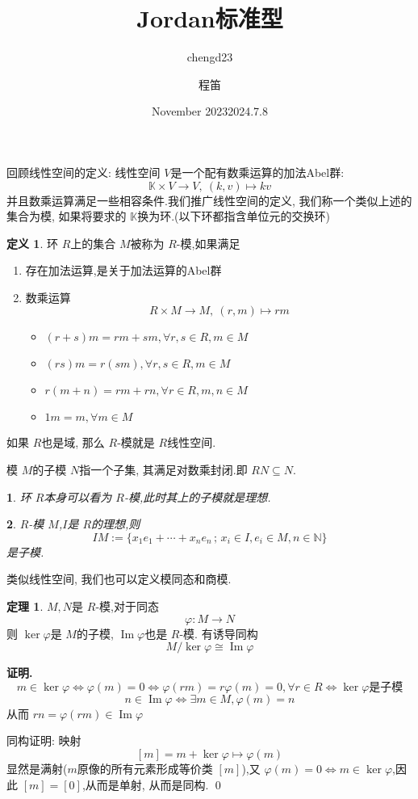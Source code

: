 \documentclass[12pt, a4paper,oneside, UTF8]{ctexart}
\author{chengd23 }
\date{November 2023}
\title{\textbf{Jordan标准型}}
\author{程笛}
\date{2024.7.8}
\theoremstyle{definition}
\newtheorem{defn}{\indent 定义}
\newtheorem{thm}[lemma]{\indent 定理}
\theoremstyle{plain}
\newtheorem{example}{\indent {例}} %
\renewenvironment{proof}{\par\textbf{证明.}\;}{\qed\par}
\begin{document}
\maketitle
回顾线性空间的定义:
线性空间 $V$是一个配有数乘运算的加法Abel群:
\[
\mathbb{K} \times V \to V, \ (k,v) \mapsto kv
\] 
并且数乘运算满足一些相容条件.我们推广线性空间的定义, 我们称一个类似上述的集合为模, 如果将要求的 $\mathbb{K}$换为环.(以下环都指含单位元的交换环)

\begin{defn}
    环 $R$上的集合 $M$被称为 $R$-模,如果满足
    \begin{enumerate}
        \item 存在加法运算,是关于加法运算的Abel群
        \item 数乘运算
        \[
        R \times M \to M, \ (r,m) \mapsto rm
        \]
    \begin{itemize}
        \item $(r+s)m = rm+sm, \forall r,s \in R, m \in M$
        \item $(rs)m = r(sm), \forall r,s \in R, m \in M$
        \item $r(m+n)= rm+rn,\forall r \in R, m,n \in M$
        \item $1m = m, \forall m \in M$
    \end{itemize}
    \end{enumerate}
\end{defn}

如果 $R$也是域, 那么 $R$-模就是 $R$线性空间.


模 $M$的子模 $N$指一个子集, 其满足对数乘封闭.即 $RN \subseteq N$.

\begin{example}
    环 $R$本身可以看为 $R$-模,此时其上的子模就是理想.
\end{example}
    \begin{example}
    $R$-模 $M$,$I$是 $R$的理想,则
    \[
    IM :=\{ x_1e_1+ \cdots +x_ne_{n}\, ;\, x_{i}\in I, e_{i}\in M ,n\in \mathbb{N}\}
    \]
    是子模.
\end{example}


类似线性空间, 我们也可以定义模同态和商模.


\begin{thm}
    $M,N$是 $R$-模,对于同态
    \[
    \varphi:M \to N
    \]
    则 $\operatorname{ker}\varphi$是 $M$的子模, $\operatorname{Im}\varphi$也是 $R$-模.
    有诱导同构
    \[
    M / \operatorname{ker}\varphi \cong \operatorname{Im}\varphi
    \]
\end{thm}
\begin{proof}
    $$m \in \operatorname{ker}\varphi \iff \varphi(m)= 0 \iff \varphi(rm) = r\varphi(m) = 0, \forall r \in R \iff \operatorname{ker}\varphi\text{是子模}$$
    $$n \in \operatorname{Im}\varphi \iff \exists m \in M, \varphi(m) = n $$从而 $rn = \varphi(rm)\in \operatorname{Im}\varphi$

    同构证明: 映射
    \[
    [m] = m+\operatorname{ker}\varphi \mapsto \varphi(m)
    \]显然是满射($m$原像的所有元素形成等价类 $[m]$),又 $\varphi(m) = 0 \iff m \in \operatorname{ker}\varphi$,因此 $[m] = [0]$,从而是单射, 从而是同构.
\end{proof}
\end{document}
